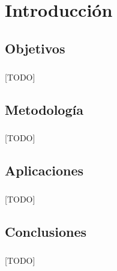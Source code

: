 \documentclass{subfiles}
\begin{document}
  \chapter{Introducción}
  \label{chap:introduction}

    \section{Objetivos}
    \label{sec:introduction_objectives}

      \paragraph{}
      [TODO]

    \section{Metodología}
    \label{sec:introduction_metodology}

      \paragraph{}
      [TODO]

    \section{Aplicaciones}
    \label{sec:introduction_applications}

      \paragraph{}
      [TODO]

    \section{Conclusiones}
    \label{sec:introdution_conclusions}

      \paragraph{}
      [TODO]
\end{document}
